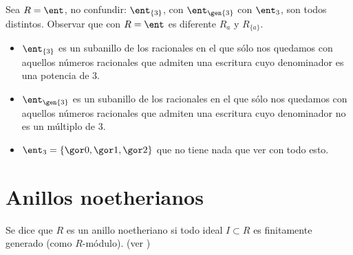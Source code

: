 Sea $R=\ent$, no confundir: $\ent_{\{3\}}$, con $\ent_{\gen{3}}$ con $\ent_3$, son todos distintos. Observar que con $R=\ent$ es diferente $R_a$ y $R_{\{a\}}$.
\begin{itemize}
	\item $\ent_{\{3\}}$ es un subanillo de los racionales en el que sólo nos quedamos con aquellos números racionales que admiten una escritura cuyo denominador es una potencia de 3.
	\item $\ent_{\gen{3}}$ es un subanillo de los racionales en el que sólo nos quedamos con aquellos números racionales que admiten una escritura cuyo denominador no es un múltiplo de 3.
	\item $\ent_3=\{ \cls{0},\cls{1},\cls{2} \}$ que no tiene nada que ver con todo esto.
\end{itemize}

\section{Anillos noetherianos}
\begin{defn} \label{def:AnilloNoetheriano}
	Se dice que $R$ es un anillo noetheriano si todo ideal $I \subset R$ es finitamente generado (como $R$-módulo). (ver )

\end{defn}

